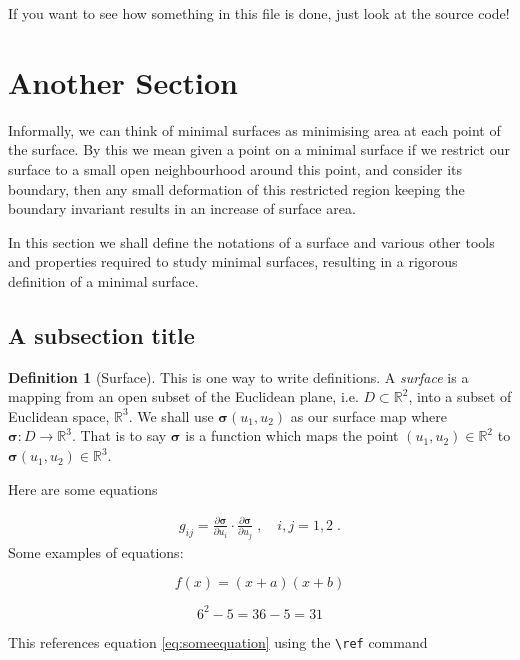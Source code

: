 \documentclass[a4paper,11pt]{article}
\numberwithin{equation}{section}
\theoremstyle{definition}
\newtheorem{definition}{Definition}
\newcommand{\dbyd}[2]{\frac{\partial #1}{\partial #2}}
\newcommand{\vsig}{{\bm{\sigma}}}
\newcommand{\R}{\mathbb{R}}
\newcommand{\uone}{{u_1}}
\newcommand{\utwo}{{u_2}}
\begin{document}
If you want to see how something in this file is done, just look at the
source code!

\section{Another Section} 
\label{sec:2}

Informally, we can think of minimal surfaces as minimising area at
each point of the surface. By this we mean given a point on a minimal
surface if we restrict our surface to a small open neighbourhood
around this point, and consider its boundary, then any small
deformation of this restricted region keeping the boundary invariant
results in an increase of surface area. 

In this section we shall define the notations of a surface and various
other tools and properties required to study minimal surfaces,
resulting in a rigorous definition of a minimal surface. 

\subsection{A subsection title}
\label{mike}

\begin{definition}[Surface] This is one way to write definitions.
A \emph{surface} is a mapping from an open subset of the Euclidean
plane, i.e. $D \subset \R^2 $, into a subset of Euclidean space, $
\R^3 $. We shall use $\vsig(\uone, \utwo)$ as our surface map where $\vsig :
D \rightarrow \R^3 $. That is to say $\vsig$ is a function which maps
the point $(\uone, \utwo) \in \R^2$ to $\vsig(\uone,\utwo) \in \R^3$. 
\end{definition}

Here are some equations

\begin{align}
  g_{ij} 
= \dbyd{\vsig}{u_i} \cdot \dbyd{\vsig}{u_j}
\;, 
 \quad i, j = 1, 2\;. 
\label{fund1}
\end{align}
Some examples of equations:


\begin{equation} 
f(x)=(x+a)(x+b)
\end{equation}

\begin{equation} \label{eq:someequation}
6^2 - 5 = 36-5 = 31
\end{equation}

This references equation \ref{eq:someequation} using the \verb#\ref# command
\end{document}
